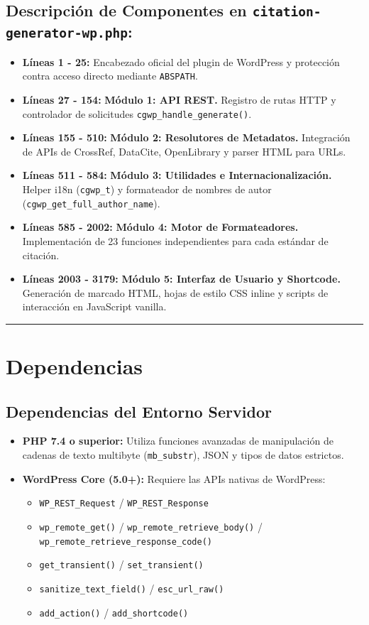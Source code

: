 \documentclass[11pt, a4paper]{article}
\begin{document}
\subsection{Descripción de Componentes en \texttt{citation-generator-wp.php}:}
\begin{itemize}
\item \textbf{Líneas 1 - 25:} Encabezado oficial del plugin de WordPress y protección contra acceso directo mediante \texttt{ABSPATH}.
\item \textbf{Líneas 27 - 154:} \textbf{Módulo 1: API REST.} Registro de rutas HTTP y controlador de solicitudes \texttt{cgwp\_handle\_generate()}.
\item \textbf{Líneas 155 - 510:} \textbf{Módulo 2: Resolutores de Metadatos.} Integración de APIs de CrossRef, DataCite, OpenLibrary y parser HTML para URLs.
\item \textbf{Líneas 511 - 584:} \textbf{Módulo 3: Utilidades e Internacionalización.} Helper i18n (\texttt{cgwp\_t}) y formateador de nombres de autor (\texttt{cgwp\_get\_full\_author\_name}).
\item \textbf{Líneas 585 - 2002:} \textbf{Módulo 4: Motor de Formateadores.} Implementación de 23 funciones independientes para cada estándar de citación.
\item \textbf{Líneas 2003 - 3179:} \textbf{Módulo 5: Interfaz de Usuario y Shortcode.} Generación de marcado HTML, hojas de estilo CSS inline y scripts de interacción en JavaScript vanilla.
\end{itemize}

\bigskip\noindent\rule{\textwidth}{0.4pt}\bigskip


\section{Dependencias}

\subsection{Dependencias del Entorno Servidor}
\begin{itemize}
\item \textbf{PHP 7.4 o superior:} Utiliza funciones avanzadas de manipulación de cadenas de texto multibyte (\texttt{mb\_substr}), JSON y tipos de datos estrictos.
\item \textbf{WordPress Core (5.0+):} Requiere las APIs nativas de WordPress:
\begin{itemize}
\item \texttt{WP\_REST\_Request} / \texttt{WP\_REST\_Response}
\item \texttt{wp\_remote\_get()} / \texttt{wp\_remote\_retrieve\_body()} / \texttt{wp\_remote\_retrieve\_response\_code()}
\item \texttt{get\_transient()} / \texttt{set\_transient()}
\item \texttt{sanitize\_text\_field()} / \texttt{esc\_url\_raw()}
\item \texttt{add\_action()} / \texttt{add\_shortcode()}
\end{itemize}
\end{itemize}
\end{document}

